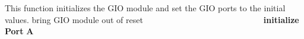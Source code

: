 This function initializes the G\+IO module and set the G\+IO ports to the initial values. bring G\+IO module out of reset ~\newline
~\newline
~\newline
~\newline
~\newline
~\newline
~\newline
~\newline
~\newline
~\newline
~\newline
~\newline
~\newline
~\newline
~\newline
~\newline
~\newline
 {\bfseries initialize} {\bfseries Port} {\bfseries A} ~\newline
~\newline
~\newline
~\newline
~\newline
~\newline
~\newline
~\newline
~\newline
~\newline
~\newline
~\newline
~\newline
~\newline
~\newline
~\newline

